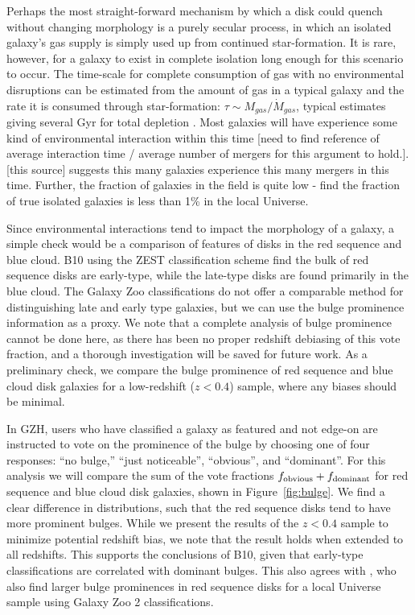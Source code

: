 \documentclass[useAMS,usenatbib]{mn2e}
\begin{document}
Perhaps the most straight-forward mechanism by which a disk could quench without changing morphology is a purely secular process, in which an isolated galaxy's gas supply is simply used up from continued star-formation. It is rare, however, for a galaxy to exist in complete isolation long enough for this scenario to occur. The time-scale for complete consumption of gas with no environmental disruptions can be estimated from the amount of gas in a typical galaxy and the rate it is consumed through star-formation: $\tau \sim M_{gas}/\dot{M}_{gas}$, typical estimates giving several Gyr for total depletion \citep{Larson1980,Kaviraj2011,Hatton2003,Schawinski2014}. Most galaxies will have experience some kind of environmental interaction within this time [need to find reference of average interaction time / average number of mergers for this argument to hold.]. [this source] suggests this many galaxies experience this many mergers in this time. Further, the fraction of galaxies in the field is quite low - \citet{Tully1987} find the fraction of true isolated galaxies is less than 1\% in the local Universe. 

Since environmental interactions tend to impact the morphology of a galaxy, a simple check would be a comparison of features of disks in the red sequence and blue cloud. B10 using the ZEST classification scheme find the bulk of red sequence disks are early-type, while the late-type disks are found primarily in the blue cloud. The Galaxy Zoo classifications do not offer a comparable method for distinguishing late and early type galaxies, but we can use the bulge prominence information as a proxy. We note that a complete analysis of bulge prominence cannot be done here, as there has been no proper redshift debiasing of this vote fraction, and a thorough investigation will be saved for future work. As a preliminary check, we compare the bulge prominence of red sequence and blue cloud disk galaxies for a low-redshift ($z<0.4$) sample, where any biases should be minimal. 

In GZH, users who have classified a galaxy as featured and not edge-on are instructed to vote on the prominence of the bulge by choosing one of four responses: ``no bulge,'' ``just noticeable'', ``obvious'', and ``dominant''. For this analysis we will compare the sum of the vote fractions $f_{\rm obvious} + f_{\rm dominant}$ for red sequence and blue cloud disk galaxies, shown in Figure~\ref{fig:bulge}. We find a clear difference in distributions, such that the red sequence disks tend to have more prominent bulges. While we present the results of the $z<0.4$ sample to minimize potential redshift bias, we note that the result holds when extended to all redshifts. This supports the conclusions of B10, given that early-type classifications are correlated with dominant bulges. This also agrees with \citet{Masters2010}, who also find larger bulge prominences in red sequence disks for a local Universe sample using Galaxy Zoo 2 classifications.
\end{document}
